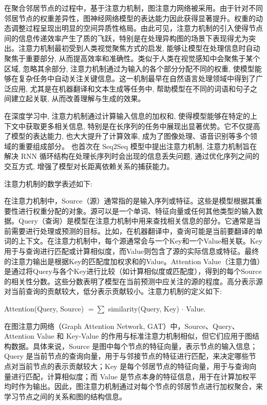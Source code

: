 在聚合邻居节点的过程中，基于注意力机制，图注意力网络被采用。由于针对不同邻居节点的权重差异性，图神经网络模型的表达能力因此获得显著提升。权重的动态调整过程呈现出明显的空间异质性格局。由此可见，注意力机制的引入使得节点间的信息传递效率产生了质的飞跃，特别是在处理异构图的场景下表现得尤为突出。注意力机制最初受到人类视觉聚焦方式的启发, 能够让模型在处理信息时自动聚焦于重要部分, 从而提高效率和准确性。类似于人类在视觉感知中会聚焦于某个区域, 忽略其余部分, 注意力机制通过为输入的各个部分分配不同的权重, 使模型能够在复杂任务中自动关注关键信息。这一机制最早在自然语言处理领域中得到了广泛应用, 尤其是在机器翻译和文本生成等任务中, 帮助模型在不同的词语和句子之间建立起关联, 从而改善理解与生成的效果。

在深度学习中, 注意力机制通过计算输入信息的加权和, 使得模型能够在特定的上下文中获取更多相关信息, 特别是在长序列的任务中展现出显著优势。它不仅提高了模型的表达能力, 也大大提升了计算效率, 成为了图像处理、语音识别等多个领域的重要组成部分。\textcite{2015_Bahdanau_Neural_machine_translation_by_jointly_learning_to_align_and_translate} 也首次在 Seq2Seq 模型中提出注意力机制, 注意力机制旨在解决 RNN 循环结构在处理长序列时会出现的信息丢失问题, 通过优化序列之间的交互方式, 增强了模型对长距离依赖关系的捕获能力。

注意力机制的数学表述如下:

在注意力机制中，Source（源）通常指的是输入序列或特征。这些是模型根据其重要性进行权重分配的对象。源可以是一个单词、特征向量或任何其他类型的输入数据。Query（查询）是模型在注意力机制中用来查找相关信息的部分。它通常是当前需要进行处理或预测的目标。比如，在机器翻译中，查询可能是当前要翻译的单词的上下文。在注意力机制中，每个源通常会与一个Key和一个Value相关联。Key用于与查询进行匹配或计算相似度，而Value则包含了源的实际信息或特征。最终的注意力输出是根据Key的匹配度加权求和的Value。Attention Value（注意力值）是通过将Query与各个Key进行比较（如计算相似度或匹配度），得到的每个Source的相关性分数。这些分数表明了模型在当前预测中应关注的源的程度。高分表示源对当前查询的贡献较大，低分表示贡献较小。注意力机制的定义如下:

Attention(Query, Source) \(= \sum\) similarity(Query, Key) \(\cdot\) Value.

在图注意力网络（Graph Attention Network, GAT）中，Source、Query、Attention Value 和 Key-Value 的作用与标准注意力机制相似，但它们应用于图结构数据。具体来说，Source 是图中每个节点的特征向量，表示节点的输入信息；Query 是当前节点的查询向量，用于与邻接节点的特征进行匹配，来决定哪些节点对当前节点的表示贡献较大；Key 是每个邻居节点的特征向量，用于与查询向量进行匹配，计算相似度；而 Value 是节点本身的特征信息，用于在计算加权平均时作为输出。因此，图注意力机制通过对每个节点的邻居节点进行加权聚合，来学习节点之间的关系和图的结构信息。

